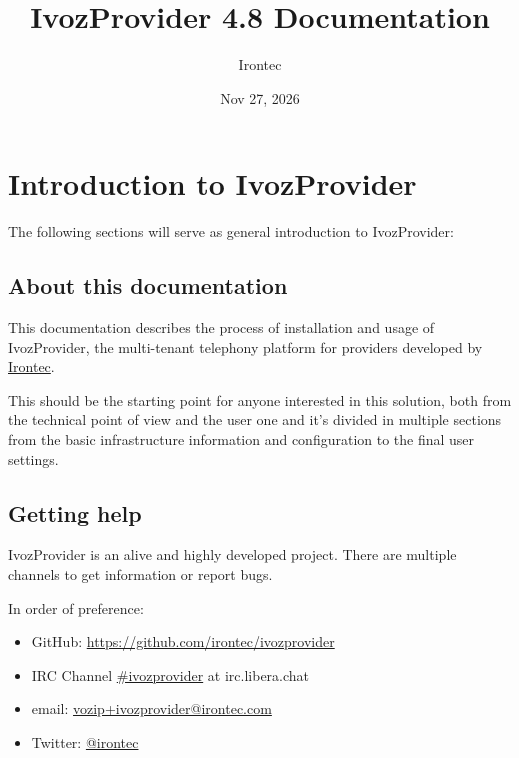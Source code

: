\documentclass[letterpaper,10pt,english]{sphinxmanual}
\title{IvozProvider 4.8 Documentation}
\date{Nov 27, 2026}
\author{Irontec}
\begin{document}
\maketitle
\tableofcontents
{}\label{index::doc}



\chapter{Introduction to IvozProvider}
\label{basic_concepts/intro/index::doc}\label{basic_concepts/intro/index:introduction-to-ivozprovider}\label{basic_concepts/intro/index:ivozprovider-official-documentation}
The following sections will serve as general introduction to IvozProvider:


\section{About this documentation}
\label{basic_concepts/intro/about::doc}\label{basic_concepts/intro/about:about-this-documentation}
This documentation describes the process of installation and usage of
IvozProvider, the multi-tenant telephony platform for providers developed
by \href{http://irontec.com}{Irontec}.

This should be the starting point for anyone interested in this solution,
both from the technical point of view and the user one and it's divided
in multiple sections from the basic infrastructure information and configuration
to the final user settings.


\section{Getting help}
\label{basic_concepts/intro/getting_help:getting-help}\label{basic_concepts/intro/getting_help::doc}\label{basic_concepts/intro/getting_help:id1}
IvozProvider is an alive and highly developed project. There are
multiple channels to get information or report bugs.

In order of preference:
\begin{itemize}
\item {} 
GitHub: \url{https://github.com/irontec/ivozprovider}

\item {} 
IRC Channel \href{https://kiwiirc.com/nextclient/irc.libera.chat/\#ivozprovider}{\#ivozprovider} at irc.libera.chat

\item {} 
email: \href{mailto:vozip+ivozprovider@irontec.com}{vozip+ivozprovider@irontec.com}

\item {} 
Twitter: \href{https://twitter.com/irontec}{@irontec}

\end{itemize}
\end{document}
